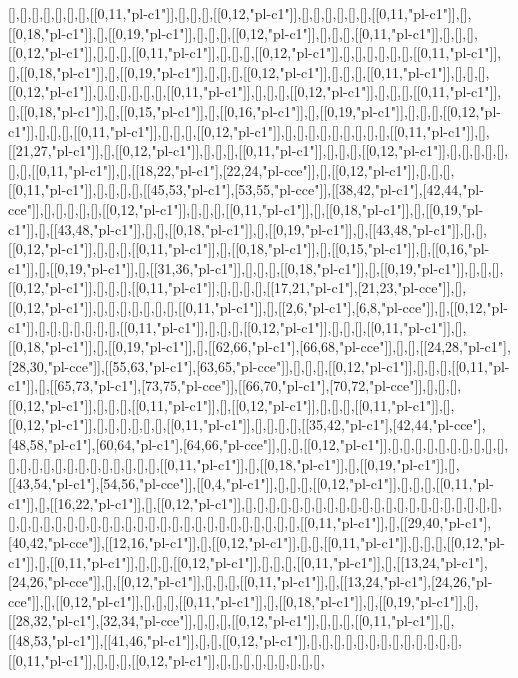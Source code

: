 [],[],[],[],[],[],[],[[0,11,"pl-c1"]],[],[],[],[[0,12,"pl-c1"]],[],[],[],[],[],[],[[0,11,"pl-c1"]],[],[[0,18,"pl-c1"]],[],[[0,19,"pl-c1"]],[],[],[],[[0,12,"pl-c1"]],[],[],[],[[0,11,"pl-c1"]],[],[],[],[[0,12,"pl-c1"]],[],[],[],[[0,11,"pl-c1"]],[],[],[],[[0,12,"pl-c1"]],[],[],[],[],[],[],[[0,11,"pl-c1"]],[],[[0,18,"pl-c1"]],[],[[0,19,"pl-c1"]],[],[],[],[[0,12,"pl-c1"]],[],[],[],[[0,11,"pl-c1"]],[],[],[],[[0,12,"pl-c1"]],[],[],[],[],[],[],[[0,11,"pl-c1"]],[],[],[],[[0,12,"pl-c1"]],[],[],[],[[0,11,"pl-c1"]],[],[[0,18,"pl-c1"]],[],[[0,15,"pl-c1"]],[],[[0,16,"pl-c1"]],[],[[0,19,"pl-c1"]],[],[],[],[[0,12,"pl-c1"]],[],[],[],[[0,11,"pl-c1"]],[],[],[],[[0,12,"pl-c1"]],[],[],[],[],[],[],[],[],[],[[0,11,"pl-c1"]],[],[[21,27,"pl-c1"]],[],[[0,12,"pl-c1"]],[],[],[],[[0,11,"pl-c1"]],[],[],[],[[0,12,"pl-c1"]],[],[],[],[],[],[],[],[[0,11,"pl-c1"]],[],[[18,22,"pl-c1"],[22,24,"pl-cce"]],[],[[0,12,"pl-c1"]],[],[],[],[[0,11,"pl-c1"]],[],[],[],[],[[45,53,"pl-c1"],[53,55,"pl-cce"]],[[38,42,"pl-c1"],[42,44,"pl-cce"]],[],[],[],[],[],[[0,12,"pl-c1"]],[],[],[],[[0,11,"pl-c1"]],[],[[0,18,"pl-c1"]],[],[[0,19,"pl-c1"]],[],[[43,48,"pl-c1"]],[],[],[[0,18,"pl-c1"]],[],[[0,19,"pl-c1"]],[],[[43,48,"pl-c1"]],[],[],[[0,12,"pl-c1"]],[],[],[],[[0,11,"pl-c1"]],[],[[0,18,"pl-c1"]],[],[[0,15,"pl-c1"]],[],[[0,16,"pl-c1"]],[],[[0,19,"pl-c1"]],[],[[31,36,"pl-c1"]],[],[],[],[[0,18,"pl-c1"]],[],[[0,19,"pl-c1"]],[],[],[],[[0,12,"pl-c1"]],[],[],[],[[0,11,"pl-c1"]],[],[],[],[],[[17,21,"pl-c1"],[21,23,"pl-cce"]],[],[[0,12,"pl-c1"]],[],[],[],[],[],[],[],[[0,11,"pl-c1"]],[],[[2,6,"pl-c1"],[6,8,"pl-cce"]],[],[[0,12,"pl-c1"]],[],[],[],[],[],[],[],[[0,11,"pl-c1"]],[],[],[],[[0,12,"pl-c1"]],[],[],[],[[0,11,"pl-c1"]],[],[[0,18,"pl-c1"]],[],[[0,19,"pl-c1"]],[],[[62,66,"pl-c1"],[66,68,"pl-cce"]],[],[],[[24,28,"pl-c1"],[28,30,"pl-cce"]],[[55,63,"pl-c1"],[63,65,"pl-cce"]],[],[],[],[[0,12,"pl-c1"]],[],[],[],[[0,11,"pl-c1"]],[],[[65,73,"pl-c1"],[73,75,"pl-cce"]],[[66,70,"pl-c1"],[70,72,"pl-cce"]],[],[],[],[[0,12,"pl-c1"]],[],[],[],[[0,11,"pl-c1"]],[],[[0,12,"pl-c1"]],[],[],[],[[0,11,"pl-c1"]],[],[[0,12,"pl-c1"]],[],[],[],[],[],[],[[0,11,"pl-c1"]],[],[],[],[],[[35,42,"pl-c1"],[42,44,"pl-cce"],[48,58,"pl-c1"],[60,64,"pl-c1"],[64,66,"pl-cce"]],[],[],[[0,12,"pl-c1"]],[],[],[],[],[],[],[],[],[],[],[],[],[],[],[],[],[],[],[],[],[],[],[],[[0,11,"pl-c1"]],[],[[0,18,"pl-c1"]],[],[[0,19,"pl-c1"]],[],[[43,54,"pl-c1"],[54,56,"pl-cce"]],[[0,4,"pl-c1"]],[],[],[],[[0,12,"pl-c1"]],[],[],[],[[0,11,"pl-c1"]],[],[[16,22,"pl-c1"]],[],[[0,12,"pl-c1"]],[],[],[],[],[],[],[],[],[],[],[],[],[],[],[],[],[],[],[],[],[],[],[],[],[],[],[],[],[],[],[],[],[],[],[],[],[],[],[],[],[],[],[],[],[],[],[],[[0,11,"pl-c1"]],[],[[29,40,"pl-c1"],[40,42,"pl-cce"]],[[12,16,"pl-c1"]],[],[[0,12,"pl-c1"]],[],[],[[0,11,"pl-c1"]],[],[],[],[[0,12,"pl-c1"]],[],[[0,11,"pl-c1"]],[],[],[],[[0,12,"pl-c1"]],[],[],[],[[0,11,"pl-c1"]],[],[[13,24,"pl-c1"],[24,26,"pl-cce"]],[],[[0,12,"pl-c1"]],[],[],[],[[0,11,"pl-c1"]],[],[[13,24,"pl-c1"],[24,26,"pl-cce"]],[],[[0,12,"pl-c1"]],[],[],[],[[0,11,"pl-c1"]],[],[[0,18,"pl-c1"]],[],[[0,19,"pl-c1"]],[],[[28,32,"pl-c1"],[32,34,"pl-cce"]],[],[],[],[[0,12,"pl-c1"]],[],[],[],[[0,11,"pl-c1"]],[],[[48,53,"pl-c1"]],[[41,46,"pl-c1"]],[],[],[[0,12,"pl-c1"]],[],[],[],[],[],[],[],[],[],[],[],[],[],[[0,11,"pl-c1"]],[],[],[],[[0,12,"pl-c1"]],[],[],[],[],[],[],[],[],[],